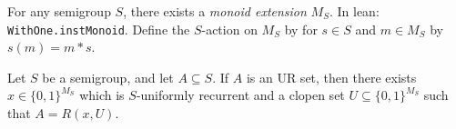 \begin{definition}
    For any semigroup $S$, there exists a \emph{monoid extension} $M_S$.  In lean: \verb|WithOne.instMonoid|.  Define the $S$-action on $M_S$ by for $s \in S$ and $m \in M_S$ by $s(m) = m * s$.
\end{definition}

\begin{lemma}
    \label{lemma_unif_rec_implies_UR}
    \leanok{}
    Let $S$ be a semigroup, and let $A \subseteq S$.  If $A$ is an UR set, then there exists $x \in \{0, 1\}^{M_S}$ which is $S$-uniformly recurrent and a clopen set $U \subseteq \{0,1\}^{M_S}$ such that $A = R(x,U)$.
\end{lemma}




